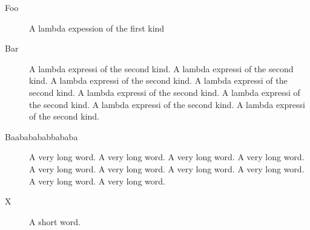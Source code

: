 \begin{description}
\item[Foo]A lambda expession of the first kind
\item[Bar]A lambda expressi of the second kind.  A lambda expressi of the second kind.
A lambda expressi of the second kind.
A lambda expressi of the second kind.
A lambda expressi of the second kind.
A lambda expressi of the second kind.
A lambda expressi of the second kind.
A lambda expressi of the second kind.
\item[Baababababbababa]A very long word. A very long word.
A very long word. A very long word.
A very long word. A very long word.
A very long word. A very long word.
A very long word. A very long word.
\item[X]A short word.
\end{description}
